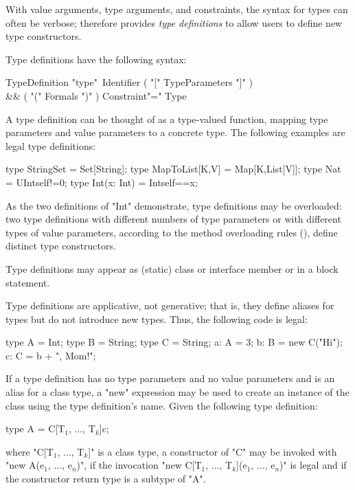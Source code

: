 With value arguments, type arguments, and constraints, the
syntax for \Xten{} types can often be verbose;
\Xten{} therefore provides {\em type definitions}
to allow users to define new type constructors.

Type definitions have the following syntax:

\begin{grammar}
TypeDefinition \: 
                \xcd"type"~Identifier
                           ( \xcd"[" TypeParameters \xcd"]" )\opt \\
                        && ( \xcd"(" Formals \xcd")" )\opt
                            Constraint\opt \xcd"=" Type \\
\end{grammar}

\noindent
A type definition can be thought of as a type-valued function,
mapping type parameters and value parameters to a concrete type.
%
The following examples are legal type definitions:
\begin{xten}
type StringSet = Set[String];
type MapToList[K,V] = Map[K,List[V]];
type Nat = UInt{self!=0};
type Int(x: Int) = Int{self==x};
\end{xten}

As the two definitions of \xcd"Int" demonstrate, type definitions may 
be overloaded: two type definitions with different numbers of type
parameters or with different types of value
parameters, according to the method overloading rules
(), define distinct type constructors.

Type definitions may appear as (static) class or interface member or
in a block statement.

Type definitions are applicative, not generative; that is, they
define aliases for types but do not introduce new types.
Thus, the following code is legal:
\begin{xten}
type A = Int;
type B = String;
type C = String;
a: A = 3;
b: B = new C("Hi");
c: C = b + ", Mom!";
\end{xten}
If a type definition has no type parameters and no value
parameters and is an alias for a class type, a \xcd"new"
expression may be used to create an instance of the class using
the type definition's name.
Given the following type definition:
\begin{xtenmath}
type A = C[T$_1$, $\dots$, T$_k$]{c};
\end{xtenmath}
where 
\xcdmath"C[T$_1$, $\dots$, T$_k$]" is a
class type, a constructor of \xcdmath"C" may be invoked with
\xcdmath"new A(e$_1$, $\dots$, e$_n$)", if the
invocation
\xcdmath"new C[T$_1$, $\dots$, T$_k$](e$_1$, $\dots$, e$_n$)" is
legal and if the constructor return type is a subtype of
\xcd"A".

